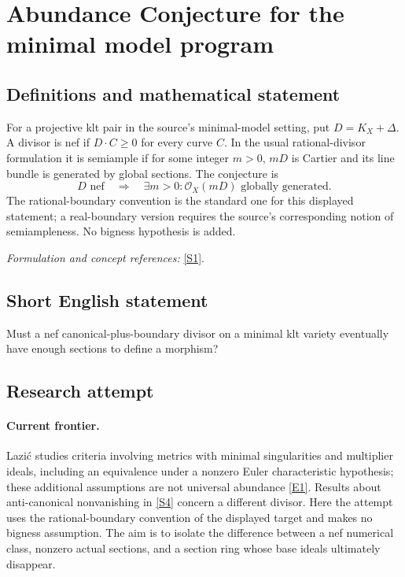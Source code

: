 \documentclass[11pt,a4paper]{article}
\numberwithin{equation}{section}
\newcommand{\sref}[2]{\hyperlink{source:#1:#2}{[S#2]}}
\newcommand{\eref}[2]{\hyperlink{extra:#1:#2}{[E#2]}}
\newif\ifshowcatalogue
\newcommand{\cataloguescope}[1]{\ifshowcatalogue
 \paragraph{Exact scope in the supplied catalogue.}
 \begin{quote}\small #1\end{quote}\fi}
\begin{document}
\setcounter{section}{0}
\section*{\texorpdfstring{Abundance Conjecture for the minimal model program}{Abundance Conjecture for the minimal model program}}\label{30006714}
\subsection{Definitions and mathematical statement}
For a projective klt pair in the source's minimal-model setting, put $D=K_X+\Delta$. A divisor is nef if $D\cdot C\ge0$ for every curve $C$. In the usual rational-divisor formulation it is semiample if for some integer $m>0$, $mD$ is Cartier and its line bundle is generated by global sections. The conjecture is
\[
 D\text{ nef}\quad\Longrightarrow\quad \exists m>0:\mathcal O_X(mD)\text{ globally generated}.
\]
The rational-boundary convention is the standard one for this displayed statement; a real-boundary version requires the source's corresponding notion of semiampleness. No bigness hypothesis is added.
\par\smallskip\textit{Formulation and concept references:} \sref{30006714}{1}.
\cataloguescope{Prove that for every minimal projective Kawamata log terminal pair (X,Delta), the nef adjoint divisor K\_X+Delta is semiample.}
\subsection{Short English statement}
Must a nef canonical-plus-boundary divisor on a minimal klt variety eventually have enough sections to define a morphism?
\subsection{Research attempt}

\paragraph{Current frontier.}
Lazi\'c studies criteria involving metrics with minimal singularities and
multiplier ideals, including an equivalence under a nonzero Euler
characteristic hypothesis; these additional assumptions are not universal
abundance \eref{30006714}{1}. Results about anti-canonical nonvanishing in
\sref{30006714}{4} concern a different divisor. Here the attempt uses the
rational-boundary convention of the displayed target and makes no bigness
assumption. The aim is to isolate the difference between a nef numerical
class, nonzero actual sections, and a section ring whose base ideals
ultimately disappear.
\end{document}
